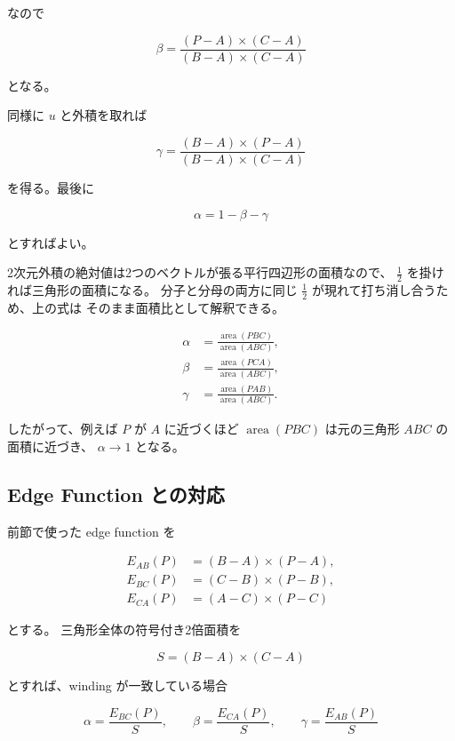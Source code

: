 \documentclass[a4paper,11pt]{ltjsarticle}
\begin{document}
なので

\begin{equation}
  \boxed{
    \beta=
    \frac{(P-A)\times(C-A)}
         {(B-A)\times(C-A)}
  }
\end{equation}

となる。

同様に $u$ と外積を取れば

\begin{equation}
  \boxed{
    \gamma=
    \frac{(B-A)\times(P-A)}
         {(B-A)\times(C-A)}
  }
\end{equation}

を得る。最後に

\[
  \alpha=1-\beta-\gamma
\]

とすればよい。

2次元外積の絶対値は2つのベクトルが張る平行四辺形の面積なので、
$\frac12$ を掛ければ三角形の面積になる。
分子と分母の両方に同じ $\frac12$ が現れて打ち消し合うため、上の式は
そのまま面積比として解釈できる。

\begin{align*}
  \alpha&=\frac{\operatorname{area}(PBC)}{\operatorname{area}(ABC)},\\
  \beta &=\frac{\operatorname{area}(PCA)}{\operatorname{area}(ABC)},\\
  \gamma&=\frac{\operatorname{area}(PAB)}{\operatorname{area}(ABC)}.
\end{align*}

したがって、例えば $P$ が $A$ に近づくほど
$\operatorname{area}(PBC)$ は元の三角形 $ABC$ の面積に近づき、
$\alpha\rightarrow1$ となる。

\subsection{Edge Function との対応}

前節で使った edge function を

\begin{align*}
  E_{AB}(P)&=(B-A)\times(P-A),\\
  E_{BC}(P)&=(C-B)\times(P-B),\\
  E_{CA}(P)&=(A-C)\times(P-C)
\end{align*}

とする。
三角形全体の符号付き2倍面積を

\[
  S=(B-A)\times(C-A)
\]

とすれば、winding が一致している場合

\begin{equation}
  \boxed{
    \alpha=\frac{E_{BC}(P)}{S},\qquad
    \beta =\frac{E_{CA}(P)}{S},\qquad
    \gamma=\frac{E_{AB}(P)}{S}
  }
\end{equation}
\end{document}
